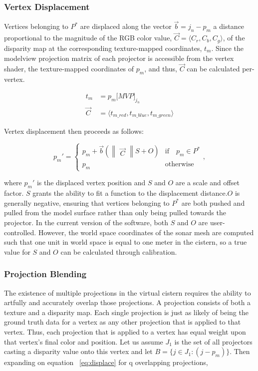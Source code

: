 \documentclass[a4paper,twoside]{article}
\begin{document}
\subsubsection{Vertex Displacement}

Vertices belonging to $P^{*}$ are displaced along the vector $\vec{b} = j_{n} - p_{m}$ a distance proportional to the magnitude of the RGB color value, $\vec{C} = \langle C_{r}, C_{b}, C_{g} \rangle$, of the disparity map at the corresponding texture-mapped coordinates, $t_m$. Since the modelview projection matrix of each projector is accessible from the vertex shader, the texture-mapped coordinates of $p_m$, and thus, $\vec{C}$ can be calculated per-vertex.

\begin{align}
t_{m} &= p_{m}\lbrack MVP \rbrack _{j_{n}} \\
\vec{C} &= \langle t_{m\_red}, t_{m\_blue}, t_{m\_green} \rangle
\end{align}

Vertex displacement then proceeds as follows:

\begin{equation}
p_{m}' = \left \{ 
\begin{array}{ll}
p_{m} + \vec{b} (\begin{Vmatrix}\vec{C}\end{Vmatrix} S + O) & \text{if} \quad p_{m} \in P^{*}\\
p_{m} & \text{otherwise}
\end{array},\right.
\label{eq:displace}
\end{equation}

where $p_{m}'$ is the displaced vertex position and $S$ and $O$ are a scale and offset factor. $S$ grants the ability to fit a function to the displacement distance.$O$ is generally negative, ensuring that vertices belonging to $P^{*}$ are both pushed and pulled from the model surface rather than only being pulled towards the projector. In the current version of the software, both $S$ and $O$ are user-controlled. However, the world space coordinates of the sonar mesh are computed such that one unit in world space is equal to one meter in the cistern, so a true value for $S$ and $O$ can be calculated through calibration.
 
 \subsubsection{Projection Blending}

The existence of multiple projections in the virtual cistern requires the ability to artfully and accurately overlap those projections.
A projection consists of both a texture and a disparity map.
Each single projection is just as likely of being the ground truth data for a vertex as any other projection that is applied to that vertex. 
Thus, each projection that is applied to a vertex has equal weight upon that vertex's final color and position.
Let us assume $J_1$ is the set of all projectors casting a disparity value onto this vertex and let $B = \{j \in J_1 : (j - p_m)\}$. 
Then expanding on equation ~\ref{eq:displace} for q overlapping projections,
\end{document}
